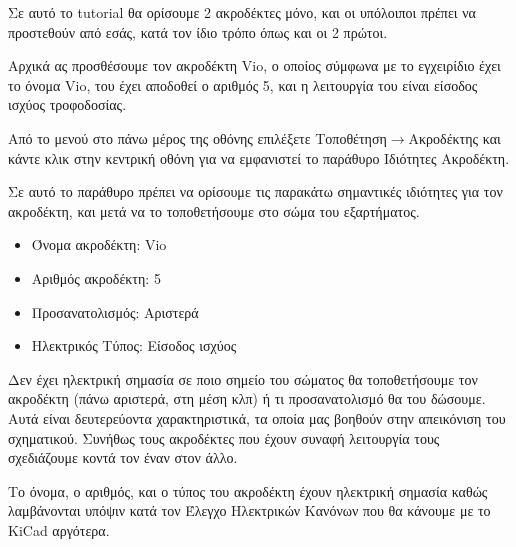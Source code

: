 \documentclass[a4paper]{article}
\begin{document}
\begin{figure}
  \begin{center}
    \label{fig:kicad-main}
  \end{center}
\end{figure}

Σε αυτό το tutorial θα ορίσουμε 2 ακροδέκτες μόνο, και οι υπόλοιποι πρέπει να προστεθούν από εσάς, κατά τον ίδιο τρόπο όπως και οι 2 πρώτοι.

Αρχικά ας προσθέσουμε τον ακροδέκτη Vio, ο οποίος σύμφωνα με το εγχειρίδιο έχει το όνομα Vio, του έχει αποδοθεί ο αριθμός 5, και η λειτουργία του είναι είσοδος ισχύος τροφοδοσίας.

Από το μενού στο πάνω μέρος της οθόνης επιλέξετε Τοποθέτηση$\rightarrow$Ακροδέκτης και κάντε κλικ στην κεντρική οθόνη για να εμφανιστεί το παράθυρο Ιδιότητες Ακροδέκτη.

\begin{figure}
  \begin{center}
    \label{fig:kicad-main}
  \end{center}
\end{figure}

Σε αυτό το παράθυρο πρέπει να ορίσουμε τις παρακάτω σημαντικές ιδιότητες για τον ακροδέκτη, και μετά να το τοποθετήσουμε στο σώμα του εξαρτήματος.

\begin{itemize}
    \item Όνομα ακροδέκτη: Vio
    \item Αριθμός ακροδέκτη: 5
    \item Προσανατολισμός: Αριστερά
    \item Ηλεκτρικός Τύπος: Είσοδος ισχύος
\end{itemize}

Δεν έχει ηλεκτρική σημασία σε ποιο σημείο του σώματος θα τοποθετήσουμε τον ακροδέκτη (πάνω αριστερά, στη μέση κλπ) ή τι προσανατολισμό θα του δώσουμε. Αυτά είναι δευτερεύοντα χαρακτηριστικά, τα οποία μας βοηθούν στην απεικόνιση του σχηματικού. Συνήθως τους ακροδέκτες που έχουν συναφή λειτουργία τους σχεδιάζουμε κοντά τον έναν στον άλλο.

Το όνομα, ο αριθμός, και ο τύπος του ακροδέκτη έχουν ηλεκτρική σημασία καθώς λαμβάνονται υπόψιν κατά τον Έλεγχο Ηλεκτρικών Κανόνων που θα κάνουμε με το KiCad αργότερα.

\begin{figure}
  \begin{center}
    \label{fig:kicad-main}
  \end{center}
\end{figure}
\end{document}
